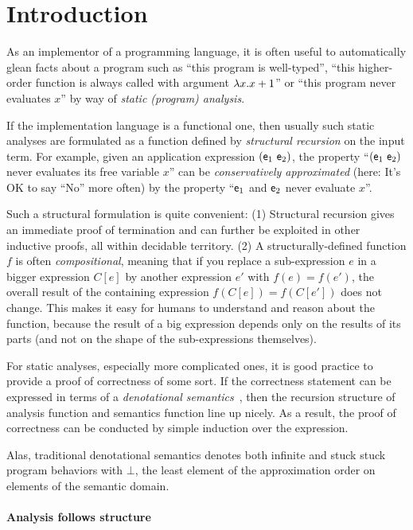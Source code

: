 \section{Introduction}
\label{sec:introduction}

As an implementor of a programming language, it is often useful to automatically
glean facts about a program such as ``this program is well-typed'', ``this
higher-order function is always called with argument $\lambda x. x+1$'' or ``this
program never evaluates $x$'' by way of \emph{static (program) analysis}.

If the implementation language is a functional one, then usually such static
analyses are formulated as a function defined by \emph{structural recursion} on
the input term.
For example, given an application expression $(\mathsf{e}_1~\mathsf{e}_2)$,
the property ``$(\mathsf{e}_1~\mathsf{e}_2)$ never evaluates its free variable $x$'' can be
\emph{conservatively approximated} (here: It's OK to say ``No'' more often) by
the property ``$\mathsf{e}_1$ and $\mathsf{e}_2$ never evaluate $x$''.

Such a structural formulation is quite convenient:
(1) Structural recursion gives an immediate proof of termination and can
    further be exploited in other inductive proofs, all within decidable
    territory.
(2) A structurally-defined function $f$ is often \emph{compositional}, meaning that
    if you replace a sub-expression $e$ in a bigger expression $C[e]$ by another
    expression $e'$ with $f(e) = f(e')$, the overall result
    of the containing expression $f(C[e]) = f(C[e'])$ does not change.
    This makes it easy for humans to understand and reason about the function,
    because the result of a big expression depends only on the results of its
    parts (and not on the shape of the sub-expressions themselves).

For static analyses, especially more complicated ones, it is good practice to
provide a proof of correctness of some sort. If the correctness statement can
be expressed in terms of a \emph{denotational
semantics}~\cite{ScottStrachey:71}, then the recursion structure of analysis
function and semantics function line up nicely. As a result, the proof of
correctness can be conducted by simple induction over the expression.

Alas, traditional denotational semantics denotes both infinite and stuck
stuck program behaviors with $\bot$, the least element of the approximation
order on elements of the semantic domain.

\paragraph{Analysis follows structure}
